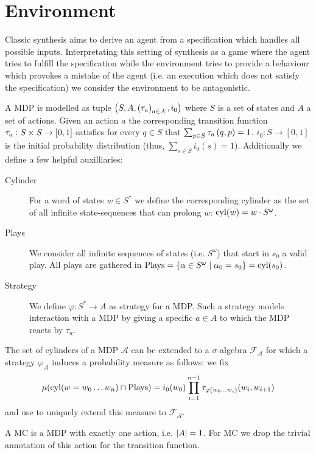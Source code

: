 \chapter{Environment}
Classic synthesis aims to derive an agent from a specification which handles
all possible inputs. Interpretating this setting of synthesis as a game where
the agent tries to fulfill the specification while the environment tries to
provide a behaviour which provokes a mistake of the agent (i.e. an execution
which does not satisfy the specification) we consider the environment to be
antagonistic.
\begin{definition}
  A \acl*{MDP} is modelled as tuple
  $\left(S, A, \left(\tau_{a}\right)_{a\in A}, i_{0}\right)$ where $S$ is a set of states
  and $A$ a set of actions. Given an action $a$ the corresponding transition
  function $\tau_{a}:S\times S\rightarrow \left[0,1\right]$ satisfies for every
  $q\in S$ that $\sum_{p\in S}\tau_{a}\left(q,p\right) = 1$.
  $i_{0}:S\rightarrow [0,1]$ is the initial probability distribution (thus,
  $\sum_{s\in S}i_{0}(s) = 1$). Additionally we define a few helpful
  auxilliaries:
  \begin{description}
    \item [Cylinder] For a word of states $w\in S^{*}$ we define the
      corresponding cylinder as the set of all infinite state-sequences
      that can prolong $w$: $\operatorname{cyl}(w) = w\cdot S^{\omega}$.
    \item [Plays] We consider all infinite sequences of states
      (i.e. $S^{\omega}$) that start in $s_{0}$ a valid play. All plays
      are gathered in $\operatorname{Plays} = \left\{
        \alpha\in S^{\omega}\mid \alpha_{0} = s_{0}\right\} = \operatorname{cyl}(s_{0})$.
    \item [Strategy] We define $\varphi:S^{*}\rightarrow A$ as strategy for
      a \ac{MDP}. Such a strategy models interaction with a \ac{MDP} by
      giving a specific $a\in A$ to which the \ac{MDP} reacts by $\tau_{a}$.
  \end{description}
\end{definition}
The set of cylinders of a \ac{MDP} $\mathcal{A}$ can be extended to a
$\sigma$-algebra $\mathcal{F}_{\mathcal{A}}$ for which a strategy
$\varphi_{\mathcal{A}}$ induces a probability measure as follows: we fix
\begin{equation}
\mu(\operatorname{cyl}(w = w_{0}\dots w_{n})\cap\operatorname{Plays}) = 
i_{0}(w_{0})\prod_{i=1}^{n-1}\tau_{\varphi(w_{0}\dots w_{i})}(w_{i}, w_{i+1})
\end{equation}
and use  to uniquely extend this measure
to $\mathcal{F}_{\mathcal{A}}$.
\begin{definition}
  A \ac{MC} is a \ac{MDP} with exactly one action, i.e. $\left\vert{A}\right\vert = 1$. For \ac{MC}
  we drop the trivial annotation of this action for the transition function.
\end{definition}
